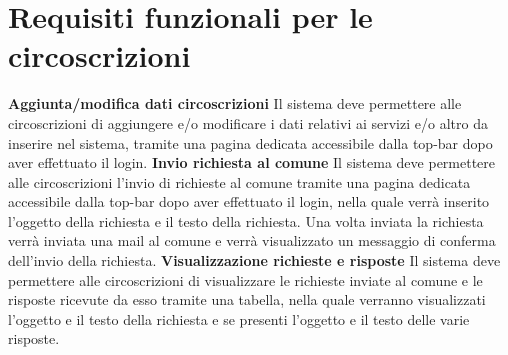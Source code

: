     \section{Requisiti funzionali per le circoscrizioni}
        \begin{rfList}
            \rfItem \textbf{Aggiunta/modifica dati circoscrizioni} Il sistema deve permettere alle circoscrizioni di aggiungere e/o modificare i dati relativi ai servizi e/o altro da inserire nel sistema, tramite una pagina dedicata accessibile dalla top-bar dopo aver effettuato il login.
            \rfItem \textbf{Invio richiesta al comune} Il sistema deve permettere alle circoscrizioni l'invio di richieste al comune tramite una pagina dedicata accessibile dalla top-bar dopo aver effettuato il login, nella quale verrà inserito l'oggetto della richiesta e il testo della richiesta. Una volta inviata la richiesta verrà inviata una mail al comune e verrà visualizzato un messaggio di conferma dell'invio della richiesta.
            \rfItem \textbf{Visualizzazione richieste e risposte} Il sistema deve permettere alle circoscrizioni di visualizzare le richieste inviate al comune e le risposte ricevute da esso tramite una tabella, nella quale verranno visualizzati l'oggetto e il testo della richiesta e se presenti l'oggetto e il testo delle varie risposte.
        \end{rfList}